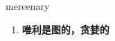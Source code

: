 
\begin{frame}
{\huge mercenary}
\begin{center}
\begin{enumerate}\Large
  \item \textbf{唯利是图的，贪婪的}
\end{enumerate}
\end{center}
\end{frame}
